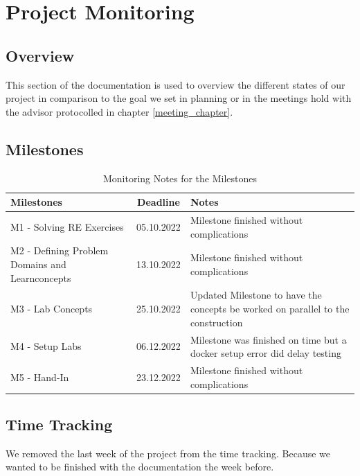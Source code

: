 \section{Project Monitoring}
\subsection{Overview}
This section of the documentation is used to overview the different states of our project in comparison to the goal we set in planning or in the meetings hold with the advisor protocolled in chapter \ref*{meeting_chapter}.

\subsection{Milestones}

\begin{table}[H]
    \centering
    \begin{tabular}[]{|| p{5cm} | c | p{6.2cm} ||}
        \hline
        Milestones & Deadline & Notes \\
        \hline \hline
        M1 - Solving RE Exercises & 05.10.2022 & Milestone finished without complications \\
        \hline
        M2 - Defining Problem Domains and Learnconcepts& 13.10.2022 & Milestone finished without complications \\
        \hline
        M3 - Lab Concepts & 25.10.2022 & Updated Milestone to have the concepts be worked on parallel to the construction \\
        \hline
        M4 - Setup Labs & 06.12.2022 & Milestone was finished on time but a docker setup error did delay testing\\
        \hline
        M5 - Hand-In & 23.12.2022 & Milestone finished without complications \\
        \hline
    \end{tabular}
    \caption{Monitoring Notes for the Milestones}
    \label{milestones_monitoring_table}
\end{table}

\subsection{Time Tracking}

We removed the last week of the project from the time tracking. Because we wanted to be finished with the documentation the week before.

